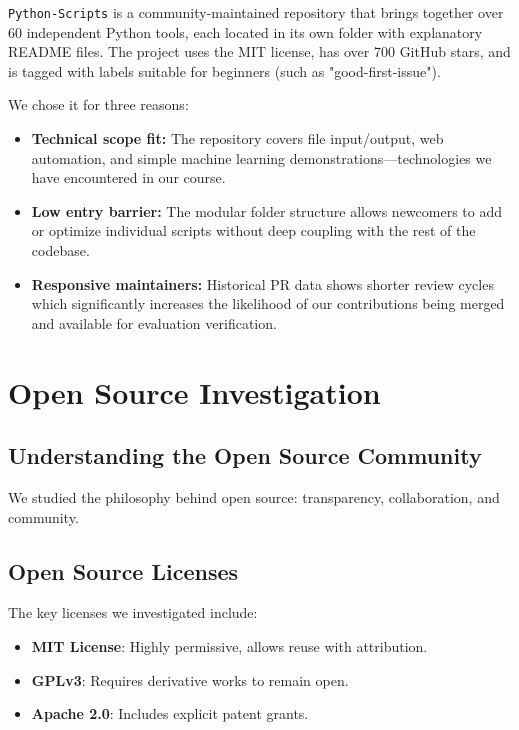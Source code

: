 \documentclass[12pt]{article}
\begin{document}
\texttt{Python-Scripts} is a community-maintained repository that brings together over 60 independent Python tools, each located in its own folder with explanatory README files. The project uses the MIT license, has over 700 GitHub stars, and is tagged with labels suitable for beginners (such as "good-first-issue"). 

We chose it for three reasons: 
\begin{itemize}
    \item \textbf{Technical scope fit:} The repository covers file input/output, web automation, and simple machine learning demonstrations—technologies we have encountered in our course.
    \item \textbf{Low entry barrier:} The modular folder structure allows newcomers to add or optimize individual scripts without deep coupling with the rest of the codebase.
    \item \textbf{Responsive maintainers:} Historical PR data shows shorter review cycles which significantly increases the likelihood of our contributions being merged and available for evaluation verification.
\end{itemize}



\section{Open Source Investigation}

\subsection{Understanding the Open Source Community}
We studied the philosophy behind open source: transparency, collaboration, and community.

\subsection{Open Source Licenses}
The key licenses we investigated include:

\begin{itemize}
    \item \textbf{MIT License}: Highly permissive, allows reuse with attribution.
    \item \textbf{GPLv3}: Requires derivative works to remain open.
    \item \textbf{Apache 2.0}: Includes explicit patent grants.
\end{itemize}
\end{document}
